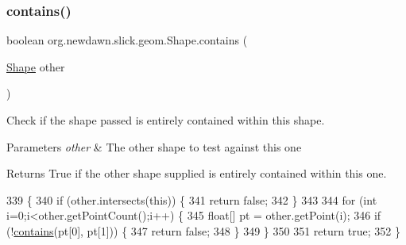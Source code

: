 \subsubsection{\texorpdfstring{contains()}{contains()}\hspace{0.1cm}{\footnotesize\ttfamily [1/2]}}
{\footnotesize\ttfamily boolean org.\+newdawn.\+slick.\+geom.\+Shape.\+contains (\begin{DoxyParamCaption}\item[{\mbox{\hyperlink{classorg_1_1newdawn_1_1slick_1_1geom_1_1_shape}{Shape}}}]{other }\end{DoxyParamCaption})\hspace{0.3cm}{\ttfamily [inline]}}

Check if the shape passed is entirely contained within this shape.


\begin{DoxyParams}{Parameters}
{\em other} & The other shape to test against this one \\
\hline
\end{DoxyParams}
\begin{DoxyReturn}{Returns}
True if the other shape supplied is entirely contained within this one. 
\end{DoxyReturn}

\begin{DoxyCode}
339                                          \{
340         \textcolor{keywordflow}{if} (other.intersects(\textcolor{keyword}{this})) \{
341             \textcolor{keywordflow}{return} \textcolor{keyword}{false};
342         \}
343         
344         \textcolor{keywordflow}{for} (\textcolor{keywordtype}{int} i=0;i<other.getPointCount();i++) \{
345             \textcolor{keywordtype}{float}[] pt = other.getPoint(i);
346             \textcolor{keywordflow}{if} (!\mbox{\hyperlink{classorg_1_1newdawn_1_1slick_1_1geom_1_1_shape_ae9dcbe23fb1bcd01bac0ddcfe09685de}{contains}}(pt[0], pt[1])) \{
347                 \textcolor{keywordflow}{return} \textcolor{keyword}{false};
348             \}
349         \}
350         
351         \textcolor{keywordflow}{return} \textcolor{keyword}{true};
352     \}
\end{DoxyCode}
\mbox{\label{classorg_1_1newdawn_1_1slick_1_1geom_1_1_shape_ad0ec4e8e6ef5aaaa4b222833995b8e6c}} 
